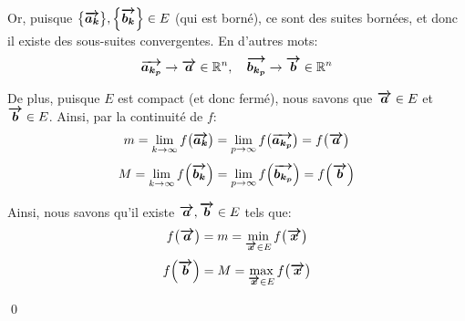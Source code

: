 \documentclass[a4paper]{article}
\begin{document}
{{        Or, puisque $\left\{\bvec{a_k}\right\}, \left\{\bvec{b_k}\right\} \in E$ (qui est borné), ce sont des suites bornées, et donc il existe des sous-suites convergentes. En d'autres mots: 
        \[\bm{\protect\overrightarrow{a_{k_p}}} \to \bm{\protect\overrightarrow{a}} \in \mathbb{R}^n, \quad \bm{\protect\overrightarrow{b_{k_p}}} \to \bm{\protect\overrightarrow{b}} \in \mathbb{R}^n\]
        
        De plus, puisque $E$ est compact (et donc fermé), nous savons que $\bm{\protect\overrightarrow{a}} \in E$ et $\bm{\protect\overrightarrow{b}} \in E$. Ainsi, par la continuité de $f$: 
        \[m = \lim_{k \to \infty} f\left(\bvec{a_k}\right) = \lim_{p \to \infty} f\left(\bvec{a_{k_p}}\right) = f\left(\bvec{a}\right)\]
        \[M = \lim_{k \to \infty} f\left(\bvec{b_k}\right) = \lim_{p \to \infty} f\left(\bvec{b_{k_p}}\right) = f\left(\bvec{b}\right)\]

        Ainsi, nous savons qu'il existe $\bm{\protect\overrightarrow{a}}, \bm{\protect\overrightarrow{b}} \in E$ tels que: 
        \[f\left(\bvec{a}\right) = m = \min_{\bvec{x} \in E} f\left(\bvec{x}\right)\]
        \[f\left(\bvec{b}\right) = M = \max_{\bvec{x} \in E} f\left(\bvec{x}\right)\]

        \qed
    }
}
\end{document}
